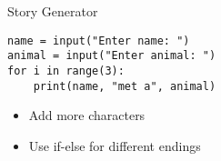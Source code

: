 \begin{frame}[fragile]{Story Generator}
    \begin{lstlisting}
name = input("Enter name: ")
animal = input("Enter animal: ")
for i in range(3):
    print(name, "met a", animal)
    \end{lstlisting}
  
    \pause
    \begin{itemize}
      \item Add more characters
      \item Use if-else for different endings
    \end{itemize}
  \end{frame}
